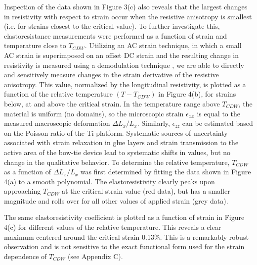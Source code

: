 \documentclass[%
 reprint, %
amsmath,amssymb,
aps,
]{revtex4-2}
\begin{document}
Inspection of the data shown in Figure 3(c) also reveals that the largest changes in resistivity with respect to strain occur when the resistive anisotropy is smallest (i.e. for strains closest to the critical value). To further investigate this, elastoresistance measurements were performed as a function of strain and temperature close to $T_{CDW}$. Utilizing an AC strain technique, in which a small AC strain is superimposed on an offset DC strain and the resulting change in resistivity is measured using a demodulation technique \cite{Hristov2018}, we are able to directly and sensitively measure changes in the strain derivative of the resistive anisotropy. This value, normalized by the longitudinal resistivity, is plotted as a function of the relative temperature $(T-T_{CDW})$ in Figure 4(b), for strains below, at and above the critical strain. In the temperature range above $T_{CDW}$, the material is uniform (no domains), so the microscopic strain $\epsilon_{xx}$ is equal to the measured macroscopic deformation $\Delta L_{x}/L_{x}$. Similarly, $\epsilon_{zz}$ can be estimated based on the Poisson ratio of the Ti platform. Systematic sources of uncertainty associated with strain relaxation in glue layers and strain transmission to the active area of the bow-tie device lead to systematic shifts in values, but no change in the qualitative behavior. To determine the relative temperature, $T_{CDW}$ as a function of $\Delta L_{x}/L_x$ was first determined by fitting the data shown in Figure 4(a) to a smooth polynomial. The elastoresistivity clearly peaks upon approaching $T_{CDW}$ at the critical strain value (red data), but has a smaller magnitude and rolls over for all other values of applied strain (grey data).


The same elastoresistivity coefficient is plotted as a function of strain in Figure 4(c) for different values of the relative temperature. This reveals a clear maximum centered around the critical strain 0.13$\%$. This is a remarkably robust observation and is not sensitive to the exact functional form used for the strain dependence of $T_{CDW}$ (see Appendix C). 
\end{document}
